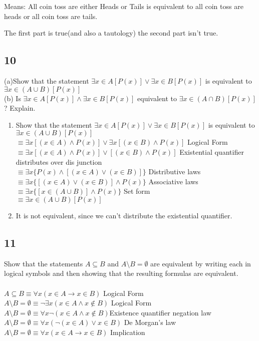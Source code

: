 \documentclass{article}
\begin{document}
Means: All coin toss are either Heads or Tails is equivalent to all coin toss are heads or all coin toss are tails.

The first part is true(and also a tautology) the second part isn't true. 
\subsection{10}
(a)Show that the statement $\exists x \in A[P(x)] \lor \exists x \in B[P(x)]$ is equivalent to $\exists x \in (A \cup B)[P(x)]$
\\
(b) Is $\exists x \in A[P(x)] \land \exists x \in B[P(x)]$ equivalent to $\exists x \in (A \cap B)[P(x)]$? Explain.
\begin{enumerate}[label=(\alph*)]
    \item 
    Show that the statement $\exists x \in A[P(x)] \lor \exists x \in B[P(x)]$ is equivalent to $\exists x \in (A \cup B)[P(x)]$
    \\
    $\equiv \exists x [(x \in A) \land P(x)] \lor \exists x [(x \in B) \land P(x)]$ Logical Form
    \\
    $\equiv \exists x [(x \in A) \land P(x)]\lor [(x \in B)  \land P(x)]$ Existential quantifier distributes over dis junction
    \\
    $\equiv \exists x \{P(x) \land [(x \in A)\lor(x \in B)]\}$ Distributive laws
    \\
    $\equiv \exists x \{[(x \in A) \lor (x \in B)] \land P(x)\}$ Associative laws
    \\
    $\equiv \exists x \{[x \in (A \cup B)]\land P(x)\}$ Set form
    \\
    $\equiv \exists x \in (A \cup B)[P(x)]$ 
    \item
    It is not equivalent, since we can't distribute the existential quantifier.
\end{enumerate}
\subsection{11}
Show that the statements $A \subseteq B$ and $A \setminus B = \emptyset$ are equivalent by writing each in logical symbols and then showing that the resulting formulas are equivalent.
\\
\\
\underline{$A \subseteq B \equiv \forall x (x \in A \rightarrow x \in B)$} Logical Form
\\
$A \setminus B = \emptyset  \equiv \neg  \exists x (x \in A \land x \notin B)$ Logical Form
\\
$A \setminus B = \emptyset \equiv \forall x \neg(x \in A \land x \notin B)$Existence quantifier negation law
\\
$A \setminus B = \emptyset \equiv \forall x (\neg (x \in A) \lor x \in B)$ De Morgan's law
\\
\underline{$A \setminus B = \emptyset \equiv \forall x (x \in A \rightarrow x \in B)$} Implication
\end{document}
